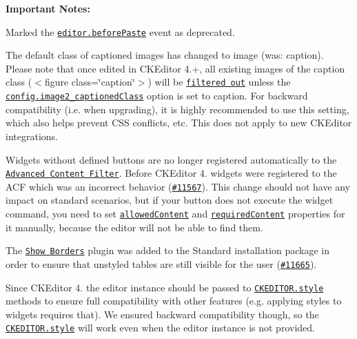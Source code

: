 {\bfseries Important Notes\+:}


\begin{DoxyItemize}
\item Marked the \href{http://docs.ckeditor.com/#!/api/CKEDITOR.editor-event-beforePaste}{\tt {\ttfamily editor.\+before\+Paste}} event as deprecated.
\item The default class of captioned images has changed to {\ttfamily image} (was\+: {\ttfamily caption}). Please note that once edited in C\+K\+Editor 4.+, all existing images of the {\ttfamily caption} class ({\ttfamily $<$figure class=\char`\"{}caption\char`\"{}$>$}) will be \href{http://docs.ckeditor.com/#!/guide/dev_advanced_content_filter}{\tt filtered out} unless the \href{http://docs.ckeditor.com/#!/api/CKEDITOR.config-cfg-image2_captionedClass}{\tt {\ttfamily config.\+image2\+\_\+captioned\+Class}} option is set to {\ttfamily caption}. For backward compatibility (i.\+e. when upgrading), it is highly recommended to use this setting, which also helps prevent C\+SS conflicts, etc. This does not apply to new C\+K\+Editor integrations.
\item Widgets without defined buttons are no longer registered automatically to the \href{http://docs.ckeditor.com/#!/guide/dev_advanced_content_filter}{\tt Advanced Content Filter}. Before C\+K\+Editor 4. widgets were registered to the A\+CF which was an incorrect behavior (\href{http://dev.ckeditor.com/ticket/11567}{\tt \#11567}). This change should not have any impact on standard scenarios, but if your button does not execute the widget command, you need to set \href{http://docs.ckeditor.com/#!/api/CKEDITOR.feature-property-allowedContent}{\tt {\ttfamily allowed\+Content}} and \href{http://docs.ckeditor.com/#!/api/CKEDITOR.feature-property-requiredContent}{\tt {\ttfamily required\+Content}} properties for it manually, because the editor will not be able to find them.
\item The \href{http://ckeditor.com/addon/showborders}{\tt Show Borders} plugin was added to the Standard installation package in order to ensure that unstyled tables are still visible for the user (\href{http://dev.ckeditor.com/ticket/11665}{\tt \#11665}).
\item Since C\+K\+Editor 4. the editor instance should be passed to \href{http://docs.ckeditor.com/#!/api/CKEDITOR.style}{\tt {\ttfamily C\+K\+E\+D\+I\+T\+O\+R.\+style}} methods to ensure full compatibility with other features (e.\+g. applying styles to widgets requires that). We ensured backward compatibility though, so the \href{http://docs.ckeditor.com/#!/api/CKEDITOR.style}{\tt {\ttfamily C\+K\+E\+D\+I\+T\+O\+R.\+style}} will work even when the editor instance is not provided.
\end{DoxyItemize}

